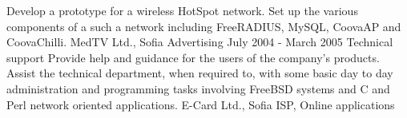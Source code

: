 {
  Develop a prototype for a wireless HotSpot network.
  Set up the various components of a such a network including FreeRADIUS, MySQL, CoovaAP and
  CoovaChilli.
}
{
  MedTV Ltd., Sofia
}
{
  Advertising
}
\ecvitem{}{} %
\ecvitem{}{} %
{
  July 2004 - March 2005
}
{
  Technical support
}
{
  Provide help and guidance for the users of the
  company's products. Assist the technical department, when required to, with some basic day to day
  administration and programming tasks involving FreeBSD systems and C and Perl network oriented
  applications.
}
{
  E-Card Ltd., Sofia
}
{
  ISP, Online applications
}


